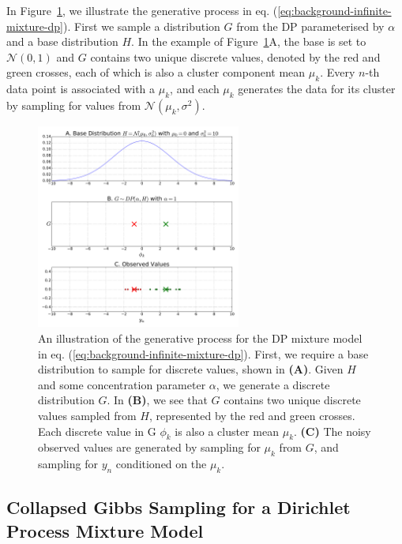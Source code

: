 In Figure~\ref{fig:g-from-dp}, we illustrate the generative process in eq. (\ref{eq:background-infinite-mixture-dp}). First we sample a distribution $G$ from the DP parameterised by $\alpha$ and a base distribution $H$. In the example of Figure~\ref{fig:g-from-dp}A, the base is set to $\mathcal{N}(0, 1)$ and $G$ contains two unique discrete values, denoted by the red and green crosses, each of which is also a cluster component mean $\mu_k$. Every $n$-th data point is associated with a $\mu_k$, and each $\mu_k$ generates the data for its cluster by sampling for values from $\mathcal{N}(\mu_k, \sigma^2)$. 
\begin{figure}
\noindent \begin{centering}
\includegraphics[width=0.6\textwidth]{03-machine-learning/figures/dp_samples.pdf}
\par\end{centering}
\caption[An illustration of the generative process for the DP mixture model in eq. (\ref{eq:background-infinite-mixture-dp}).]{\label{fig:g-from-dp}An illustration of the generative process for the DP mixture model in eq. (\ref{eq:background-infinite-mixture-dp}). First, we require a base distribution to sample for discrete values, shown in \textbf{(A)}. Given $H$ and some concentration parameter $\alpha$, we generate a discrete distribution $G$. In \textbf{(B)}, we see that $G$ contains two unique discrete values sampled from $H$, represented by the red and green crosses. Each discrete value in G $\phi_k$ is also a cluster mean $\mu_k$. \textbf{(C)} The noisy observed values are generated by sampling for $\mu_k$ from $G$, and sampling for $y_n$ conditioned on the $\mu_k$.}
\end{figure}

\subsection{Collapsed Gibbs Sampling for a Dirichlet Process Mixture Model \label{background-cgs-dpmixture}}


